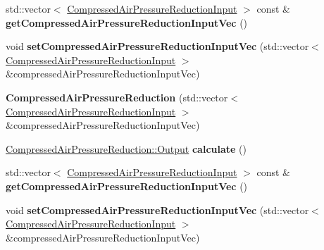 \begin{DoxyCompactItemize}
\mbox{\label{class_compressed_air_pressure_reduction_a5d560714f1159e64a091c91038d1bd1a}} 
std\+::vector$<$ \hyperlink{class_compressed_air_pressure_reduction_input}{Compressed\+Air\+Pressure\+Reduction\+Input} $>$ const  \& {\bfseries get\+Compressed\+Air\+Pressure\+Reduction\+Input\+Vec} ()
\item 
\mbox{\label{class_compressed_air_pressure_reduction_a720f44519444d8c2e48845ee84a1f069}} 
void {\bfseries set\+Compressed\+Air\+Pressure\+Reduction\+Input\+Vec} (std\+::vector$<$ \hyperlink{class_compressed_air_pressure_reduction_input}{Compressed\+Air\+Pressure\+Reduction\+Input} $>$ \&compressed\+Air\+Pressure\+Reduction\+Input\+Vec)
\item 
\mbox{\label{class_compressed_air_pressure_reduction_abb54045686aad41a011d84d9e0c86235}} 
{\bfseries Compressed\+Air\+Pressure\+Reduction} (std\+::vector$<$ \hyperlink{class_compressed_air_pressure_reduction_input}{Compressed\+Air\+Pressure\+Reduction\+Input} $>$ \&compressed\+Air\+Pressure\+Reduction\+Input\+Vec)
\item 
\mbox{\label{class_compressed_air_pressure_reduction_aa199484ec7a89eb123e359f3852b62be}} 
\hyperlink{struct_compressed_air_pressure_reduction_1_1_output}{Compressed\+Air\+Pressure\+Reduction\+::\+Output} {\bfseries calculate} ()
\item 
\mbox{\label{class_compressed_air_pressure_reduction_a5d560714f1159e64a091c91038d1bd1a}} 
std\+::vector$<$ \hyperlink{class_compressed_air_pressure_reduction_input}{Compressed\+Air\+Pressure\+Reduction\+Input} $>$ const  \& {\bfseries get\+Compressed\+Air\+Pressure\+Reduction\+Input\+Vec} ()
\item 
\mbox{\label{class_compressed_air_pressure_reduction_a720f44519444d8c2e48845ee84a1f069}} 
void {\bfseries set\+Compressed\+Air\+Pressure\+Reduction\+Input\+Vec} (std\+::vector$<$ \hyperlink{class_compressed_air_pressure_reduction_input}{Compressed\+Air\+Pressure\+Reduction\+Input} $>$ \&compressed\+Air\+Pressure\+Reduction\+Input\+Vec)
\end{DoxyCompactItemize}


